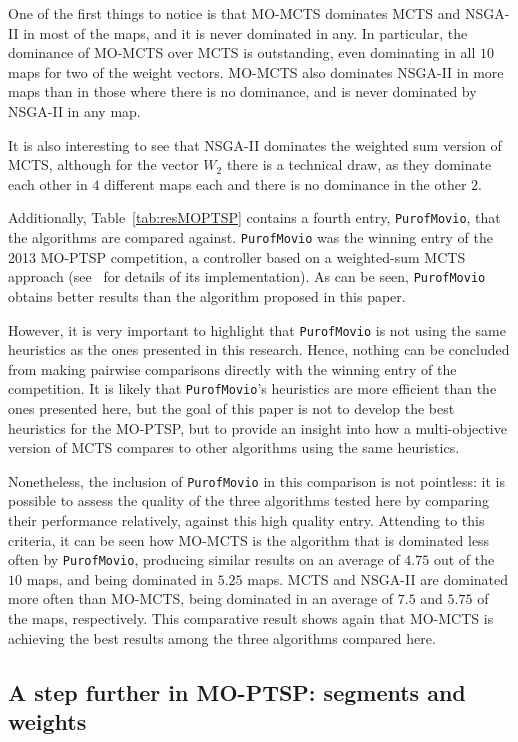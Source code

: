 \documentclass[journal]{IEEEtran}
\begin{document}
One of the first things to notice is that MO-MCTS dominates MCTS and NSGA-II in most of the maps, and it is never dominated in any. In particular, the dominance of MO-MCTS over MCTS is outstanding, even dominating in all $10$ maps for two of the weight vectors. MO-MCTS also dominates NSGA-II in more maps than in those where there is no dominance, and  is never dominated by NSGA-II in any map. 

It is also interesting to see that NSGA-II dominates the weighted sum version of MCTS, although for the vector $W_2$ there is a technical draw, as they dominate each other in $4$ different maps each and there is no dominance in the other $2$.

Additionally, Table~\ref{tab:resMOPTSP} contains a fourth entry, \texttt{PurofMovio}, that the algorithms are compared against. \texttt{PurofMovio} was the winning entry of the 2013 MO-PTSP competition, a controller based on a weighted-sum MCTS approach (see~\cite{Powley2013} for details of its implementation). As can be seen, \texttt{PurofMovio} obtains better results than the algorithm proposed in this paper.

However, it is very important to highlight that \texttt{PurofMovio} is not using the same heuristics as the ones presented in this research. Hence, nothing can be concluded from making pairwise comparisons directly with the winning entry of the competition. It is likely that \texttt{PurofMovio}'s heuristics are more efficient than the ones presented here, but the goal of this paper is not to develop the best heuristics for the MO-PTSP, but to provide an insight into how a multi-objective version of MCTS compares to other algorithms using the same heuristics.

Nonetheless, the inclusion of \texttt{PurofMovio} in this comparison is not pointless: it is possible to assess the quality of the three algorithms tested here by comparing their performance relatively, against this high quality entry. Attending to this criteria, it can be seen how MO-MCTS is the algorithm that is dominated less often by \texttt{PurofMovio}, producing similar results on an average of $4.75$ out of the $10$ maps, and being dominated in $5.25$ maps. MCTS and NSGA-II are dominated more often than MO-MCTS, being dominated in an average of $7.5$ and $5.75$ of the maps, respectively. This comparative result shows again that MO-MCTS is achieving the best results among the three algorithms compared here.

\subsection{A step further in MO-PTSP: segments and weights} \label{ssec:resVarW}
\end{document}

